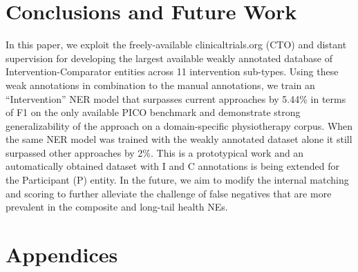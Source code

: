 \documentclass[letterpaper]{article} %
\begin{document}
\section{Conclusions and Future Work}
\label{sec:conclusion}
%
In this paper, we exploit the freely-available clinicaltrials.org (CTO) and distant supervision for developing the largest available weakly annotated database of Intervention-Comparator entities across 11 intervention sub-types.
Using these weak annotations in combination to the manual annotations, we train an ``Intervention'' NER model that surpasses current approaches  by 5.44\% in terms of F1 on the only available PICO benchmark and demonstrate strong generalizability of the approach on a domain-specific physiotherapy corpus.
When the same NER model was trained with the weakly annotated dataset alone it still surpassed other approaches by 2\%.
This is a prototypical work and an automatically obtained dataset with I and C annotations is being extended for the Participant (P) entity.
In the future, we aim to modify the internal matching and scoring to further alleviate the challenge of false negatives that are more prevalent in the composite and long-tail health NEs.
%
%
\bigskip

\clearpage
\appendix
\section{Appendices}
\label{appendix}
%
\end{document}
